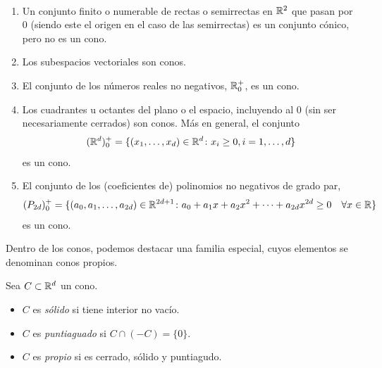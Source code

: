 \begin{example}~ \label{ex:conos}
    \begin{enumerate}
        \item Un conjunto finito o numerable de rectas o semirrectas en $\mathbb{R}^2$ que pasan por 0 (siendo este el origen en el caso de las semirrectas) es un conjunto cónico, pero no es un cono.
        \item Los subespacios vectoriales son conos.
        \item El conjunto de los números reales no negativos, $\mathbb{R}^+_0$, es un cono.
        \item Los cuadrantes u octantes del plano o el espacio, incluyendo al 0 (sin ser necesariamente cerrados) son conos. Más en general, el conjunto
                \[ (\mathbb{R}^d)^+_0 = \{(x_1,\dots,x_d) \in \mathbb{R}^d \colon x_i \ge 0, i = 1,\dots,d \} \]
              es un cono.
        \item El conjunto de los (coeficientes de) polinomios no negativos de grado par,
                \[ (P_{2d})^+_0 = \{(a_0,a_1,\dots,a_{2d}) \in \mathbb{R}^{2d+1} \colon a_0 + a_1x+a_2x^2+\dots+a_{2d}x^{2d} \ge 0\quad \forall x \in \mathbb{R} \} \]
              es un cono.
    \end{enumerate}
\end{example}

Dentro de los conos, podemos destacar una familia especial, cuyos elementos se denominan conos propios.

\begin{definition}
    Sea $C \subset \mathbb{R}^d$ un cono.
    \begin{itemize}
        \item $C$ es \emph{sólido} si tiene interior no vacío.
        \item $C$ es \emph{puntiaguado} si $C \cap (-C) = \{0\}$.
        \item $C$ es \emph{propio} si es cerrado, sólido y puntiagudo.
    \end{itemize}
\end{definition}

